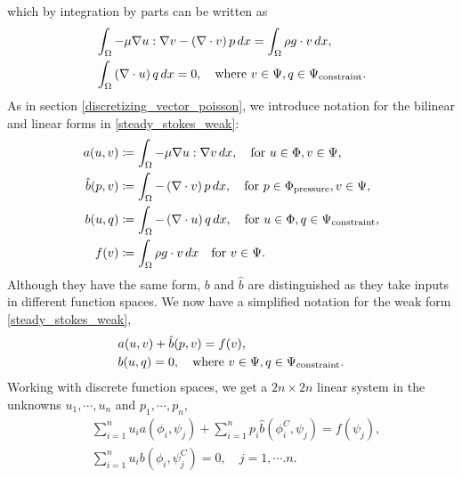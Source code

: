 \documentclass[11pt,a4paper]{memoir}
\newcommand{\om}{{\Omega}}
\begin{document}
which by integration by parts can be written as
\begin{equation}\label{steady_stokes_weak}
\begin{split}
    &\int_\om -\mu\nabla u : \nabla v - \left(\nabla\cdot v\right)p\,dx = \int_\om \rho g\cdot v\,dx,\\
    &\int_\om \left(\nabla\cdot u\right) q\,dx = 0, \quad\text{where $v \in \Psi, q \in \trialconstraint$}.
\end{split}
\end{equation}
As in section \ref{discretizing_vector_poisson}, we introduce notation for the bilinear and linear forms in \eqref{steady_stokes_weak}:
\begin{equation}
\begin{split}
    a(u, v) &\coloneqq \int_\om-\mu\nabla u : \nabla v\,dx,\quad\text{for $u \in \Phi, v \in \Psi$},\\
    \hat{b}(p, v) &\coloneqq \int_\om-\left(\nabla\cdot v\right)p\,dx,\quad\text{for $p \in \testpressure, v \in \Psi$},\\
    b(u, q) &\coloneqq \int_\om-\left(\nabla\cdot u\right)q\,dx,\quad\text{for $u \in \Phi, q \in \trialconstraint$},\\
    f(v) &\coloneqq \int_\om \rho g\cdot v\,dx\quad\text{for $v \in \Psi$}.
\end{split}
\end{equation}
Although they have the same form, $b$ and $\hat{b}$ are distinguished as they take inputs in different function spaces.
We now have a simplified notation for the weak form \eqref{steady_stokes_weak},
\begin{equation}\label{steady_stokes_weak_notation}
\begin{split}
    &a(u, v) + \hat{b}(p, v) = f(v),\\
    &b(u, q) = 0, \quad\text{where $v \in \Psi, q \in {\Psi_{\text{constraint}}}$}.
\end{split}
\end{equation}
Working with discrete function spaces, we get a $2n\times 2n$ linear system in the unknowns $u_1,\cdots,u_n$ and $p_1,\cdots,p_n$,
\begin{equation}
\begin{split}
    &\sum_{i=1}^n u_i a\left(\phi_i, \psi_j\right) + \sum_{i=1}^np_i\hat{b}\left(\phi^C_i, \psi_j\right) = f(\psi_j),\\
    &\sum_{i=1}^nu_ib\left(\phi_i, \psi^C_j\right) = 0,\quad j=1,\cdots.n.
\end{split}
\end{equation}
\end{document}

